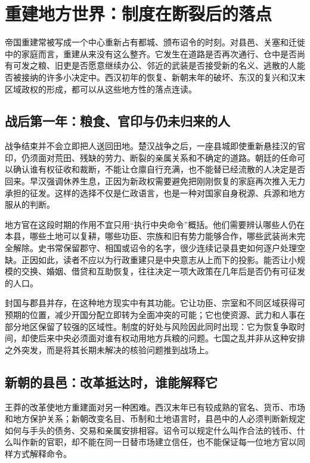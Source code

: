 \section{重建地方世界：制度在断裂后的落点}
\label{sec:synthesis-rebuilding-local}

帝国重建常被写成一个中心重新占有都城、颁布诏令的时刻。对县邑、关塞和迁徙中的家庭而言，重建从来没有这么整齐。它发生在道路是否再次通行、仓中是否尚有可发之粮、旧吏是否愿意继续办公、邻近的武装是否接受新的名义、逃散的人能否被接纳的许多小决定中。西汉初年的恢复、新朝末年的破坏、东汉的复兴和汉末区域政权的形成，都可以从这些地方性的落点连读。

\subsection{战后第一年：粮食、官印与仍未归来的人}

战争结束并不会立即把人送回田地。楚汉战争之后，一座县城即使重新悬挂汉的官印，仍须面对荒田、残缺的劳力、断裂的亲属关系和不确定的道路。朝廷的任命可以确认谁有权征收和裁断，不能让仓廪自行充满，也不能替已经流散的人决定是否回来。早汉强调休养生息，正因为新政权需要避免把刚刚恢复的家庭再次推入无力承担的征发。这样的选择不仅是仁政语言，也是一种对国家自身税源、兵源和地方服从的判断。

地方官在这段时期的作用不宜只用“执行中央命令”概括。他们需要辨认哪些人仍在本县，哪些土地可以复耕，哪些功臣、宗族和旧有势力能够合作，哪些武装尚未完全解除。史书常保留郡守、相国或诏令的名字，很少连续记录县吏如何逐户处理空缺。正因如此，读者不应以为行政重建只是中央意志从上而下的投影。能否让小规模的交换、婚姻、借贷和互助恢复，往往决定一项大政策在几年后是否仍有可征发的人口。

封国与郡县并存，在这种地方现实中有其功能。它让功臣、宗室和不同区域获得可预期的位置，减少开国分配立即转为全面冲突的可能；它也使资源、武力和人事在部分地区保留了较强的区域性。制度的好处与风险因此同时出现：它为恢复争取时间，却使后来中央必须面对谁有权动用地方兵粮的问题。七国之乱并非从这种安排之外突发，而是将其长期未解决的核验问题推到战场上。

\subsection{新朝的县邑：改革抵达时，谁能解释它}

王莽的改革使地方重建面对另一种困难。西汉末年已有较成熟的官名、货币、市场和地方保护关系；新朝改变名目、币制和土地语言时，县邑中的人必须判断新规定如何与手头的债务、交易和亲属安排相容。诏令可以规定什么叫作合法的钱币、什么叫作新的官职，却不能在同一日替市场建立信任，也不能保证每一位地方官以同样方式解释命令。

